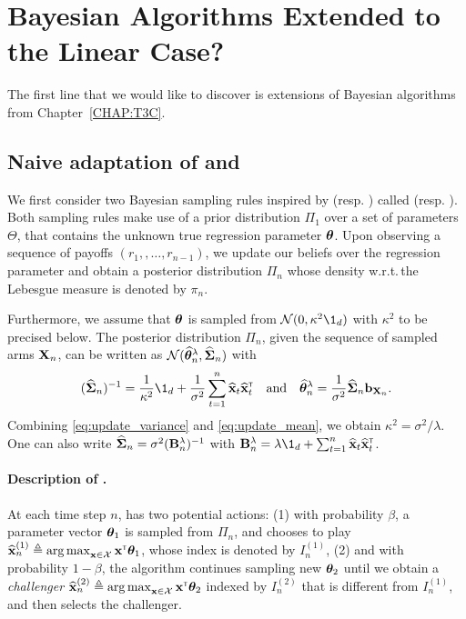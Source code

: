 \section{Bayesian Algorithms Extended to the Linear Case?}\label{sec:lgc.bayesian}

The first line that we would like to discover is extensions of Bayesian algorithms from Chapter~\ref{CHAP:T3C}.

\subsection{Naive adaptation of \TTTS{} and \TCC{}}\label{sec:lgc.bayesian.t3c}

We first consider two Bayesian sampling rules inspired by \TTTS{} (resp. \TCC{}) called \LTCS{} (resp. \LTCC{}). Both sampling rules make use of a prior distribution $\Pi_1$ over a set of parameters $\Theta$, that contains the unknown true regression parameter ${\boldsymbol \theta}$. Upon observing a sequence of payoffs $(r_1,,\ldots,r_{n-1})$, we update our beliefs over the regression parameter and obtain a posterior distribution $\Pi_{n}$ whose density w.r.t.\,the Lebesgue measure is denoted by $\pi_n$.

Furthermore, we assume that ${\boldsymbol \theta}$ is sampled from $\cN(0,\kappa^2\1_d)$ with $\kappa^2$ to be precised below. The posterior distribution $\Pi_n$, given the sequence of sampled arms ${\bf X}_n$, can be written as $\mathcal{N}(\widehat{{\boldsymbol \theta}}^\lambda_n,\widehat{{\boldsymbol \Sigma}}_n)$ %
with
\begin{align}\label{eq:update_variance}
     (\hat{\bSigma}_n)^{-1} = \frac{1}{\kappa^2}\1_d + \frac{1}{\sigma^2}\sum_{t=1}^n \hat{\bx}_t\hat{\bx}_t\transpose \quad \text{and} \quad \hat{\btheta}^\lambda_n = \frac{1}{\sigma^2}\hat{\bSigma}_n \bb_{\bX_n}.
\end{align}
Combining \eqref{eq:update_variance} and \eqref{eq:update_mean}, we obtain $\kappa^2 = \sigma^2/\lambda$. One can also write $\widehat{{\boldsymbol \Sigma}}_n = \sigma^2 ({\bf B}^{\lambda}_n)^{-1}$ with $\bB_n^\lambda = \lambda \1_d + \sum_{t=1}^n \hat{\bx}_t\hat{\bx}_t\transpose$. 

\paragraph{Description of \LTCS.} At each time step $n$, \LTCS has two potential actions: (1) with probability $\beta$, a parameter vector ${\boldsymbol \theta}_1$ is sampled from $\Pi_{n}$, and \LTCS chooses to play $\widehat{{\bf x}}_n^{(1)} \triangleq \operatorname*{arg\,max}_{{\bf x}\in\mathcal{X}} {\bf x}^\mathsf{\scriptscriptstyle T}{\boldsymbol \theta}_1$, whose index is denoted by $I_n^{(1)}$, (2) and with probability $1-\beta$, the algorithm continues sampling new ${\boldsymbol \theta}_2$ until we obtain a \emph{challenger} $\widehat{{\bf x}}_n^{(2)} \triangleq \operatorname*{arg\,max}_{{\bf x}\in\mathcal{X}} {\bf x}^\mathsf{\scriptscriptstyle T}{\boldsymbol \theta}_2$ indexed by $I_n^{(2)}$ that is different from $I_n^{(1)}$, and \LTCS then selects the challenger.

